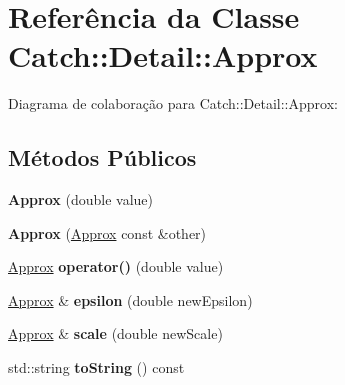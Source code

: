 \hypertarget{classCatch_1_1Detail_1_1Approx}{}\section{Referência da Classe Catch\+:\+:Detail\+:\+:Approx}
\label{classCatch_1_1Detail_1_1Approx}


Diagrama de colaboração para Catch\+:\+:Detail\+:\+:Approx\+:
\subsection*{Métodos Públicos}
\begin{DoxyCompactItemize}
\item 
{\bfseries Approx} (double value)\hypertarget{classCatch_1_1Detail_1_1Approx_a1a8618ea8db08c66bd3d9fe8f74b957a}{}\label{classCatch_1_1Detail_1_1Approx_a1a8618ea8db08c66bd3d9fe8f74b957a}

\item 
{\bfseries Approx} (\hyperlink{classCatch_1_1Detail_1_1Approx}{Approx} const \&other)\hypertarget{classCatch_1_1Detail_1_1Approx_a807330c63266fc914abdf6e461255a54}{}\label{classCatch_1_1Detail_1_1Approx_a807330c63266fc914abdf6e461255a54}

\item 
\hyperlink{classCatch_1_1Detail_1_1Approx}{Approx} {\bfseries operator()} (double value)\hypertarget{classCatch_1_1Detail_1_1Approx_a48c9cbc28a05dc9dc8c3973b9eae2268}{}\label{classCatch_1_1Detail_1_1Approx_a48c9cbc28a05dc9dc8c3973b9eae2268}

\item 
\hyperlink{classCatch_1_1Detail_1_1Approx}{Approx} \& {\bfseries epsilon} (double new\+Epsilon)\hypertarget{classCatch_1_1Detail_1_1Approx_a05c50c3ad0a971fab19345b5d94979a9}{}\label{classCatch_1_1Detail_1_1Approx_a05c50c3ad0a971fab19345b5d94979a9}

\item 
\hyperlink{classCatch_1_1Detail_1_1Approx}{Approx} \& {\bfseries scale} (double new\+Scale)\hypertarget{classCatch_1_1Detail_1_1Approx_acd80f0737bf38112beacd5ca95bef113}{}\label{classCatch_1_1Detail_1_1Approx_acd80f0737bf38112beacd5ca95bef113}

\item 
std\+::string {\bfseries to\+String} () const \hypertarget{classCatch_1_1Detail_1_1Approx_adeb74b73506b3f6b2ba72aea15168fbe}{}\label{classCatch_1_1Detail_1_1Approx_adeb74b73506b3f6b2ba72aea15168fbe}

\end{DoxyCompactItemize}
